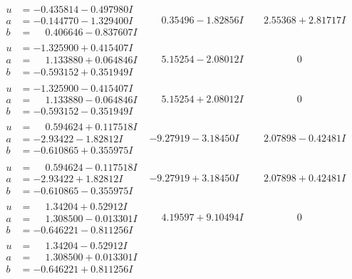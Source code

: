 \documentclass[1p]{elsarticle_modified}
\theoremstyle{definition}
\begin{document}
$$\begin{array}{c|c|c}
\begin{aligned}
u &= -0.435814 - 0.497980 I \\
a &= -0.144770 - 1.329400 I \\
b &= \phantom{-}0.406646 - 0.837607 I\end{aligned}
 & \phantom{-}0.35496 - 1.82856 I & \phantom{-}2.55368 + 2.81717 I \\ \hline\begin{aligned}
u &= -1.325900 + 0.415407 I \\
a &= \phantom{-}1.133880 + 0.064846 I \\
b &= -0.593152 + 0.351949 I\end{aligned}
 & \phantom{-}5.15254 - 2.08012 I & \phantom{-0.000000 } 0 \\ \hline\begin{aligned}
u &= -1.325900 - 0.415407 I \\
a &= \phantom{-}1.133880 - 0.064846 I \\
b &= -0.593152 - 0.351949 I\end{aligned}
 & \phantom{-}5.15254 + 2.08012 I & \phantom{-0.000000 } 0 \\ \hline\begin{aligned}
u &= \phantom{-}0.594624 + 0.117518 I \\
a &= -2.93422 - 1.82812 I \\
b &= -0.610865 + 0.355975 I\end{aligned}
 & -9.27919 - 3.18450 I & \phantom{-}2.07898 - 0.42481 I \\ \hline\begin{aligned}
u &= \phantom{-}0.594624 - 0.117518 I \\
a &= -2.93422 + 1.82812 I \\
b &= -0.610865 - 0.355975 I\end{aligned}
 & -9.27919 + 3.18450 I & \phantom{-}2.07898 + 0.42481 I \\ \hline\begin{aligned}
u &= \phantom{-}1.34204 + 0.52912 I \\
a &= \phantom{-}1.308500 - 0.013301 I \\
b &= -0.646221 - 0.811256 I\end{aligned}
 & \phantom{-}4.19597 + 9.10494 I & \phantom{-0.000000 } 0 \\ \hline\begin{aligned}
u &= \phantom{-}1.34204 - 0.52912 I \\
a &= \phantom{-}1.308500 + 0.013301 I \\
b &= -0.646221 + 0.811256 I\end{aligned}

\end{array}$$
\end{document}
